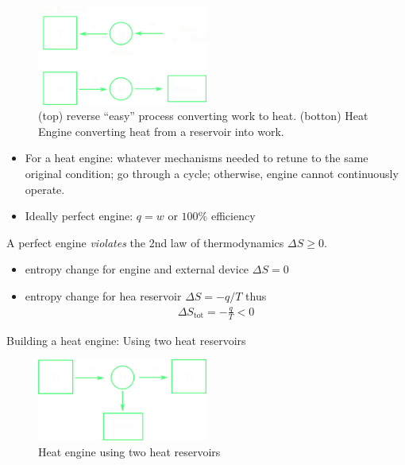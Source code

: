 \documentclass[../main.tex]{subfiles}
\begin{document}
\begin{figure}[ht]
    \centering
    \includegraphics[width=0.5\textwidth]{fig5_2.png}
    \captionsetup{width=0.8\textwidth}
    \caption{(top) reverse ``easy'' process converting work to heat. (botton) Heat Engine converting heat from a reservoir into work.}
    \label{fig:5_2}
\end{figure}

\begin{itemize}
    \item For a heat engine: whatever mechanisms needed to retune to the same 
    original condition; go through a cycle; otherwise, engine cannot continuously operate.
    \item Ideally perfect engine: $q = w$ or $100\%$ efficiency
\end{itemize}

A perfect engine \textit{violates} the 2nd law of thermodynamics $\Delta S \geq 0$.
\begin{itemize}
    \item entropy change for engine and external device $\Delta S = 0$
    \item entropy change for hea reservoir $\Delta S = -q/T$ thus
    \begin{align*}
        \Delta S_\text{tot} = -\frac{q}{T} < 0
    \end{align*}
\end{itemize}

Building a heat engine: Using two heat reservoirs

\begin{figure}[ht]
    \centering
    \includegraphics[width=0.5\textwidth]{fig5_3.png}
    \caption{Heat engine using two heat reservoirs}
    \label{fig:5_3}
\end{figure}
\end{document}
